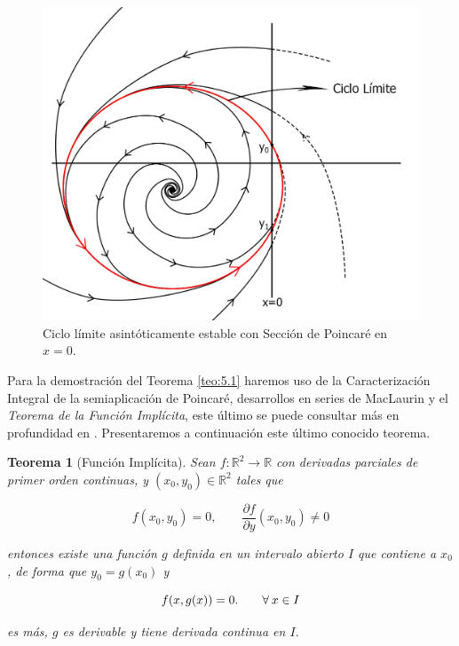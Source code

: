 \documentclass[12pt,a4paper]{report} %
\newtheorem{theorem}{Teorema}[chapter]
\begin{document}
	\newpage
	
	\begin{figure}[h]
		\centering
		\includegraphics[width=1.1\textwidth,center]{ciclolimite3x=0_v2.jpg}
		\caption{Ciclo límite asintóticamente estable con Sección de Poincaré en $x=0$.}
		\label{fig:ciclolimite3}
	\end{figure}\smallskip
	
	\newpage
	
	Para la demostración del Teorema \ref{teo:5.1} haremos uso de la Caracterización Integral de la semiaplicación de Poincaré, desarrollos en series de MacLaurin y el \textit{Teorema de la Función Implícita}, este último se puede consultar más en profundidad en \cite{tf1}. Presentaremos a continuación este último conocido teorema.
	
	\begin{theorem}[Función Implícita]
		\label{teo.fi}
		Sean $f:\mathbb{R}^2 \longrightarrow\mathbb{R}$ con derivadas parciales de primer orden continuas, y $(x_0,y_0) \in \mathbb{R}^2$ tales que
		
		\begin{equation*}
			f(x_0,y_0)=0, \qquad\frac{\partial f}{\partial y}(x_0,y_0)\neq 0
		\end{equation*}\smallskip
		
		\noindent entonces existe una función $g$ definida en un intervalo abierto $I$ que contiene a $x_0$, de forma que $y_0=g(x_0)$ y
		
		\begin{equation*}
			\scalebox{1}{$\displaystyle
			f(x,g(x))=0. \qquad \forall \: x\in I
			$}
		\end{equation*}\smallskip
		
		\noindent es más, $g$ es derivable y tiene derivada continua en $I$.
		
	\end{theorem}
	
\end{document}
